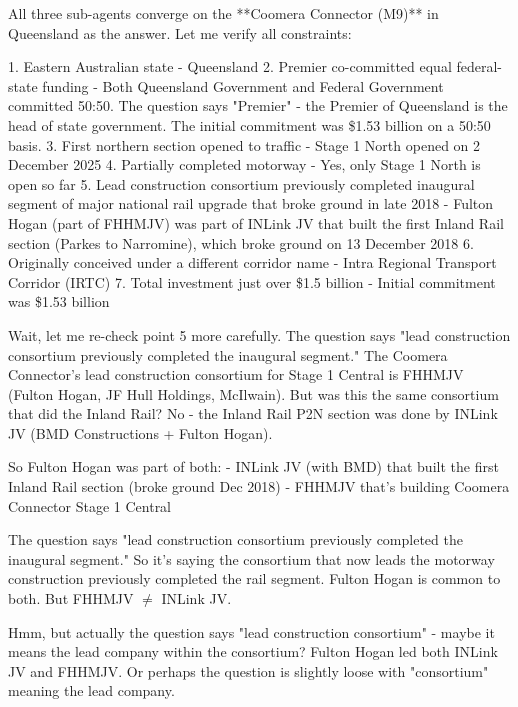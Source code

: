 \documentclass{llmxive}
\begin{document}
\begin{tcolorbox}[breakable,enhanced jigsaw,colback=yellow!12,colframe=yellow!55,boxrule=0.4pt,left=5pt,right=5pt,top=3pt,bottom=3pt,fonttitle=\bfseries\sffamily\small,coltitle=black,fontupper=\small,title={Main-agent reasoning (core judgment)}]
All three sub-agents converge on the **Coomera Connector (M9)** in Queensland as the answer. Let me verify all constraints:

1. Eastern Australian state - Queensland
2. Premier co-committed equal federal-state funding - Both Queensland Government and Federal Government committed 50:50. The question says "Premier" - the Premier of Queensland is the head of state government. The initial commitment was \$1.53 billion on a 50:50 basis.
3. First northern section opened to traffic - Stage 1 North opened on 2 December 2025
4. Partially completed motorway - Yes, only Stage 1 North is open so far
5. Lead construction consortium previously completed inaugural segment of major national rail upgrade that broke ground in late 2018 - Fulton Hogan (part of FHHMJV) was part of INLink JV that built the first Inland Rail section (Parkes to Narromine), which broke ground on 13 December 2018
6. Originally conceived under a different corridor name - Intra Regional Transport Corridor (IRTC)
7. Total investment just over \$1.5 billion - Initial commitment was \$1.53 billion

Wait, let me re-check point 5 more carefully. The question says "lead construction consortium previously completed the inaugural segment." The Coomera Connector's lead construction consortium for Stage 1 Central is FHHMJV (Fulton Hogan, JF Hull Holdings, McIlwain). But was this the same consortium that did the Inland Rail? No - the Inland Rail P2N section was done by INLink JV (BMD Constructions + Fulton Hogan).

So Fulton Hogan was part of both:
- INLink JV (with BMD) that built the first Inland Rail section (broke ground Dec 2018)
- FHHMJV that's building Coomera Connector Stage 1 Central

The question says "lead construction consortium previously completed the inaugural segment." So it's saying the consortium that now leads the motorway construction previously completed the rail segment. Fulton Hogan is common to both. But FHHMJV $\neq$ INLink JV.

Hmm, but actually the question says "lead construction consortium" - maybe it means the lead company within the consortium? Fulton Hogan led both INLink JV and FHHMJV. Or perhaps the question is slightly loose with "consortium" meaning the lead company.


\end{tcolorbox}
\end{document}
